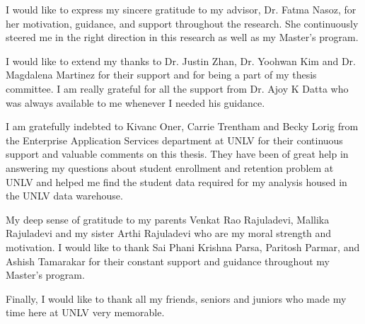 \documentclass[11pt,openright]{report}
\begin{document}


\begin{thesisacknowledgments}
I would like to express my sincere gratitude to my advisor, Dr. Fatma Nasoz, for her motivation, guidance, and support throughout the research. She continuously steered me in the right direction in this research as well as my Master's program.

I would like to extend my thanks to Dr. Justin Zhan, Dr. Yoohwan Kim and Dr. Magdalena Martinez for their support and for being a part of my thesis committee. I am really grateful for all the support from Dr. Ajoy K Datta who was always available to me whenever I needed his guidance.

I am gratefully indebted to Kivanc Oner, Carrie Trentham and Becky Lorig from the Enterprise Application Services department at UNLV for their continuous support and valuable comments on this thesis. They have been of great help in  answering my questions about student enrollment and retention problem at UNLV and helped me find the student data required for my analysis housed in the UNLV data warehouse.

My deep sense of gratitude to my parents Venkat Rao Rajuladevi, Mallika Rajuladevi and my sister Arthi Rajuladevi who are my moral strength and motivation. I would like to thank Sai Phani Krishna Parsa, Paritosh Parmar, and Ashish Tamarakar for their constant support and guidance throughout my Master's program.

Finally, I would like to thank all my friends, seniors and juniors who made my time here at UNLV very memorable. 
\end{thesisacknowledgments}

\pagestyle{plain}

\tableofcontents
\clearpage
\listoftables
\clearpage
\listoffigures
\clearpage
\clearpage
\end{document}
